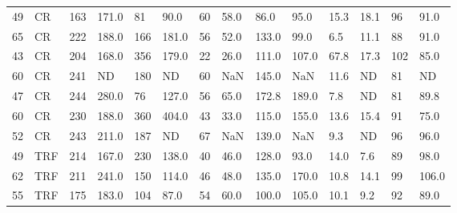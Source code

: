 \begin{longtable}{|l|l|l|l|l|l|l|l|l|l|l|l|l|l|}
  49 &    CR &                         163 &                    171.0 &                      81 &                 90.0 &            60 &       58.0 &          86.0 &       95.0 &              15.3 & 18.1 &                96 &           91.0 \\
  65 &    CR &                         222 &                    188.0 &                     166 &                181.0 &            56 &       52.0 &         133.0 &       99.0 &               6.5 & 11.1 &                88 &           91.0 \\
  43 &    CR &                         204 &                    168.0 &                     356 &                179.0 &            22 &       26.0 &         111.0 &      107.0 &              67.8 & 17.3 &               102 &           85.0 \\
  60 &    CR &                         241 &                      ND &                     180 &                  ND &            60 &        NaN &         145.0 &        NaN &              11.6 &                 ND &                81 &            ND \\
  47 &    CR &                         244 &                    280.0 &                      76 &                127.0 &            56 &       65.0 &         172.8 &      189.0 &               7.8 &                 ND &                81 &           89.8 \\
  60 &    CR &                         230 &                    188.0 &                     360 &                404.0 &            43 &       33.0 &         115.0 &      155.0 &              13.6 & 15.4 &                91 &           75.0 \\
  52 &    CR &                         243 &                    211.0 &                     187 &                  ND &            67 &        NaN &         139.0 &        NaN &               9.3 &                 ND &                96 &           96.0 \\
  49 &   TRF &                         214 &                    167.0 &                     230 &                138.0 &            40 &       46.0 &         128.0 &       93.0 &              14.0 & 7.6 &                89 &           98.0 \\
  62 &   TRF &                         211 &                    241.0 &                     150 &                114.0 &            46 &       48.0 &         135.0 &      170.0 &              10.8 & 14.1 &                99 &          106.0 \\
  55 &   TRF &                         175 &                    183.0 &                     104 &                 87.0 &            54 &       60.0 &         100.0 &      105.0 &              10.1 & 9.2 &                92 &           89.0 \\

\end{longtable}

